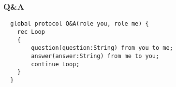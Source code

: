 %
%
%

\begin{frame}[fragile]\frametitle{Q\&A}
  \begin{lstlisting}
  global protocol Q&A(role you, role me) {
    rec Loop
    {
        question(question:String) from you to me;
        answer(answer:String) from me to you;
        continue Loop;
    }
  }
  \end{lstlisting}

\end{frame}


